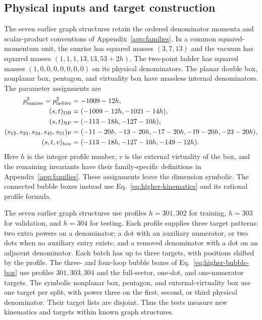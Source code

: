 \subsection{Physical inputs and target construction}
The seven earlier graph structures retain the ordered denominator momenta and scalar-product conventions of Appendix~\ref{app:families}. In a common squared-momentum unit, the sunrise has squared masses $(3,7,13)$ and the vacuum has squared masses $(1,1,1,13,13,53+2h)$. The two-point ladder has squared masses $(1,0,0,0,0,0,0,0)$ on its physical denominators. The planar double box, nonplanar box, pentagon, and virtuality box have massless internal denominators. The parameter assignments are
\begin{align}
 p^2_{\rm sunrise}=p^2_{\rm ladder}&=-1009-12h,\nonumber\\
 (s,t)_{\rm DB}&=(-1009-12h,-1021-14h),\nonumber\\
 (s,t)_{\rm NP}&=(-113-18h,-127-10h),\nonumber\\
 (s_{12},s_{23},s_{34},s_{45},s_{51})_{\rm P}
 &=(-11-20h,-13-20h,-17-20h,-19-20h,-23-20h),\nonumber\\
 (s,t,v)_{\rm box}&=(-113-18h,-127-10h,-149-12h).
 \label{eq:adaptive-kinematics}
\end{align}
Here $h$ is the integer profile number, $v$ is the external virtuality of the box, and the remaining invariants have their family-specific definitions in Appendix~\ref{app:families}. These assignments leave the dimension symbolic. The connected bubble boxes instead use Eq.~\eqref{eq:higher-kinematics} and its rational profile formula.

The seven earlier graph structures use profiles $h=301,302$ for training, $h=303$ for validation, and $h=304$ for testing. Each profile supplies three target patterns: two extra powers on a denominator; a dot with an auxiliary numerator, or two dots when no auxiliary entry exists; and a removed denominator with a dot on an adjacent denominator. Each batch has up to three targets, with positions shifted by the profile. The three- and four-loop bubble boxes of Eq.~\eqref{eq:higher-bubble-box} use profiles $301,303,304$ and the full-sector, one-dot, and one-numerator targets. The symbolic nonplanar box, pentagon, and external-virtuality box use one target per split, with power three on the first, second, or third physical denominator. Their target lists are disjoint. Thus the tests measure new kinematics and targets within known graph structures.

